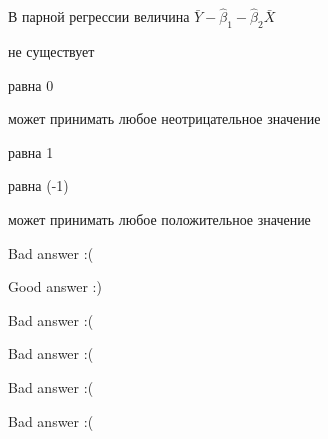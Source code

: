 
\begin{question}
В парной регрессии величина \(\bar Y - \hat\beta_1 - \hat\beta_2 \bar X\)
\begin{answerlist}
  \item не существует
  \item равна 0
  \item может принимать любое неотрицательное значение
  \item равна 1
  \item равна (-1)
  \item может принимать любое положительное значение
\end{answerlist}
\end{question}

\begin{solution}
\begin{answerlist}
  \item Bad answer :(
  \item Good answer :)
  \item Bad answer :(
  \item Bad answer :(
  \item Bad answer :(
  \item Bad answer :(
\end{answerlist}
\end{solution}

